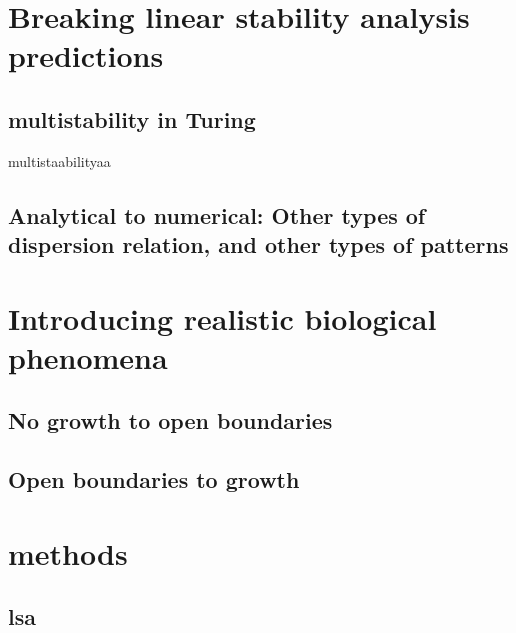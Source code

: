 \section{Breaking linear stability analysis predictions}

\subsection{multistability in Turing}
multistaabilityaa

\begin{adjustbox}{width=1.4\textwidth,center}
\begin{figure}
%
\end{figure}
\end{adjustbox}


\subsection{Analytical to numerical: Other types of dispersion relation, and other types of patterns}


\section{Introducing realistic biological phenomena}
\subsection{No growth to open boundaries}
\subsection{Open boundaries to growth}


\section{methods}
\subsection{lsa}

